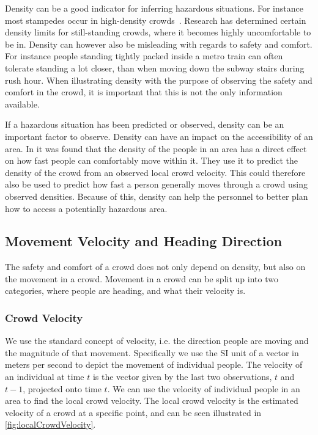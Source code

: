 Density can be a good indicator for inferring hazardous situations. For instance most stampedes occur in high-density crowds~\cite{wirz2012inferring}. Research has determined certain density limits for still-standing crowds, where it becomes highly uncomfortable to be in. Density can however also be misleading with regards to safety and comfort. For instance people standing tightly packed inside a metro train can often tolerate standing a lot closer, than when moving down the subway stairs during rush hour. When illustrating density with the purpose of observing the safety and comfort in the crowd, it is important that this is not the only information available.

If a hazardous situation has been predicted or observed, density can be an important factor to observe. Density can have an impact on the accessibility of an area. In \citet{wirz2013probing} it was found that the density of the people in an area has a direct effect on how fast people can comfortably move within it. They use it to predict the density of the crowd from an observed local crowd velocity. This could therefore also be used to predict how fast a person generally moves through a crowd using observed densities. Because of this, density can help the personnel to better plan how to access a potentially hazardous area.

\subsection{Movement Velocity and Heading Direction}
The safety and comfort of a crowd does not only depend on density, but also on the movement in a crowd. Movement in a crowd can be split up into two categories, where people are heading, and what their velocity is.

\subsubsection{Crowd Velocity}
We use the standard concept of velocity, i.e. the direction people are moving and the magnitude of that movement. Specifically we use the SI unit of a vector in meters per second to depict the movement of individual people. The velocity of an individual at time $t$ is the vector given by the last two observations, $t$ and $t-1$, projected onto time $t$. We can use the velocity of individual people in an area to find the local crowd velocity. The local crowd velocity is the estimated velocity of a crowd at a specific point, and can be seen illustrated in \cref{fig:localCrowdVelocity}.

